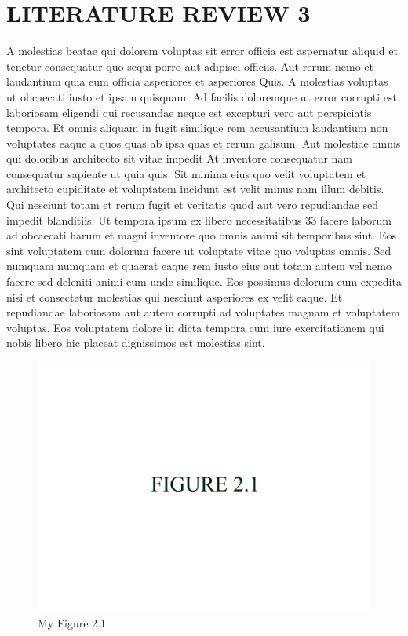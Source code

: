 \documentclass[a4paper,12pt]{report}
\begin{document}
\section{LITERATURE REVIEW 3}
\hspace{.5cm} A molestias beatae qui dolorem voluptas sit error officia est aspernatur aliquid et tenetur consequatur quo sequi porro aut adipisci officiis. Aut rerum nemo et laudantium quia eum officia asperiores et asperiores Quis. A molestias voluptas ut obcaecati iusto et ipsam quisquam. Ad facilis doloremque ut error corrupti est laboriosam eligendi qui recusandae neque est excepturi vero aut perspiciatis tempora. Et omnis aliquam in fugit similique rem accusantium laudantium non voluptates eaque a quos quas ab ipsa quas et rerum galisum. Aut molestiae omnis qui doloribus architecto sit vitae impedit At inventore consequatur nam consequatur sapiente ut quia quis. Sit minima eius quo velit voluptatem et architecto cupiditate et voluptatem incidunt est velit minus nam illum debitis. Qui nesciunt totam et rerum fugit et veritatis quod aut vero repudiandae sed impedit blanditiis. Ut tempora ipsum ex libero necessitatibus 33 facere laborum ad obcaecati harum et magni inventore quo omnis animi sit temporibus sint. Eos sint voluptatem cum dolorum facere ut voluptate vitae quo voluptas omnis. Sed numquam numquam et quaerat eaque rem iusto eius aut totam autem vel nemo facere sed deleniti animi eum unde similique. Eos possimus dolorum cum expedita nisi et consectetur molestias qui nesciunt asperiores ex velit eaque. Et repudiandae laboriosam aut autem corrupti ad voluptates magnam et voluptatem voluptas. Eos voluptatem dolore in dicta tempora cum iure exercitationem qui nobis libero hic placeat dignissimos est molestias sint. \par
\begin{figure}[h]
        \centering
        \includegraphics[width=12cm]{fig_2.1.jpg}
        \caption{My Figure 2.1}
        \label{fig:my_label}
\end{figure}
\end{document}
